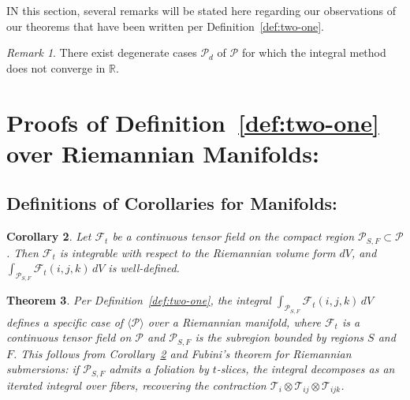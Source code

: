\documentclass[10pt]{article}
\theoremstyle{plain}
\newtheorem{theorem}{Theorem}[section]
\newtheorem{corollary}[theorem]{Corollary}
\theoremstyle{definition}
\theoremstyle{remark}
\newtheorem{remark}[theorem]{Remark}
\begin{document}
\lettrine[lines=1, lhang=0.1, loversize=0.2]{I}N this section, several remarks will be stated here regarding our observations of our theorems that have been written per Definition~\ref{def:two-one}.

\begin{remark}
\label{remark:one}
  There exist degenerate cases $\mathcal{P}_d$ of $\mathcal{P}$ for which the integral method does not converge in $\mathbb{R}$.
\end{remark}

\section{Proofs of Definition~\ref{def:two-one} over Riemannian Manifolds:}

\subsection{Definitions of Corollaries for Manifolds:}

\begin{corollary}
\label{cor:integrability}
  Let $\mathcal{F}_t$ be a continuous tensor field on the compact region $\mathcal{P}_{S,F} \subset \mathcal{P}$. Then $\mathcal{F}_t$ is integrable with respect to the Riemannian volume form $dV$, and $\int_{\mathcal{P}_{S,F}} \mathcal{F}_t(i,j,k)\,dV$ is well-defined.
\end{corollary}

\begin{theorem}
\label{theo:one}
  Per Definition~\ref{def:two-one}, the integral $\int_{\mathcal{P}_{S,F}} \mathcal{F}_t(i, j, k)\,dV$ defines a specific case of $\langle \mathcal{P} \rangle$ over a Riemannian manifold, where $\mathcal{F}_t$ is a continuous tensor field on $\mathcal{P}$ and $\mathcal{P}_{S,F}$ is the subregion bounded by regions $S$ and $F$. This follows from Corollary~\ref{cor:integrability} and Fubini's theorem for Riemannian submersions: if $\mathcal{P}_{S,F}$ admits a foliation by $t$-slices, the integral decomposes as an iterated integral over fibers, recovering the contraction $\mathcal{T}_i \otimes \mathcal{T}_{ij} \otimes \mathcal{T}_{ijk}$.
\end{theorem}
\end{document}
